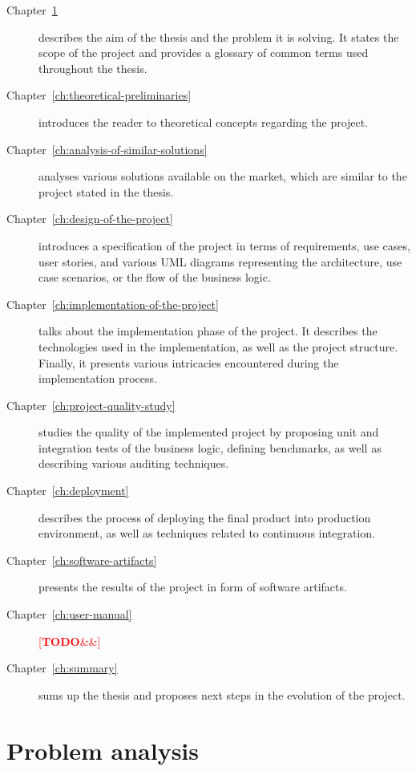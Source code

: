 \documentclass[english,bachelors,forcepolishlogotype]{wizthesis}
\newcommand{\todo}[1]{%
  \textcolor{red}{[\textbf{TODO}\ifx&#1&{}\else{ }\fi\emph{#1}]}%
}
\begin{document}
\begin{description}
  \item[Chapter~\ref{ch:problem-analysis}] describes the aim of the thesis and
  the problem it is solving. It states the scope of the project and provides a
  glossary of common terms used throughout the thesis.
  \item[Chapter~\ref{ch:theoretical-preliminaries}] introduces the reader to
  theoretical concepts regarding the project.
  \item[Chapter~\ref{ch:analysis-of-similar-solutions}] analyses various
  solutions available on the market, which are similar to the project stated in
  the thesis.
  \item[Chapter~\ref{ch:design-of-the-project}] introduces a specification of
  the project in terms of requirements, use cases, user stories, and various UML
  diagrams representing the architecture, use case scenarios, or the flow of the
  business logic.
  \item[Chapter~\ref{ch:implementation-of-the-project}] talks about the
  implementation phase of the project. It describes the technologies used in the
  implementation, as well as the project structure. Finally, it presents various
  intricacies encountered during the implementation process.
  \item[Chapter~\ref{ch:project-quality-study}] studies the quality of the
  implemented project by proposing unit and integration tests of the business
  logic, defining benchmarks, as well as describing various auditing techniques.
  \item[Chapter~\ref{ch:deployment}] describes the process of deploying the
  final product into production environment, as well as techniques related to
  continuous integration.
  \item[Chapter~\ref{ch:software-artifacts}] presents the results of the project
  in form of software artifacts.
  \item[Chapter~\ref{ch:user-manual}] \todo{}
  \item[Chapter~\ref{ch:summary}] sums up the thesis and proposes next steps
  in the evolution of the project.
\end{description}

\mainmatter %

\chapter{Problem analysis} \label{ch:problem-analysis}
\end{document}
